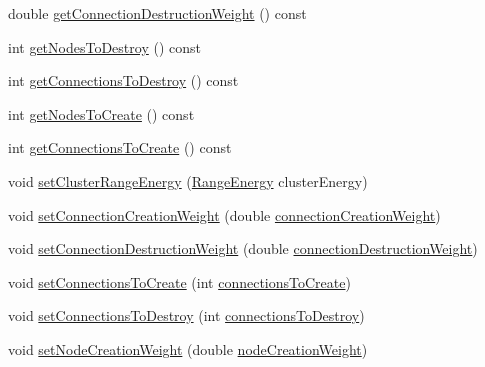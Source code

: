 \begin{DoxyCompactItemize}
\item 
double \hyperlink{classcryomesh_1_1manipulators_1_1ClusterAnalysisData_a37ebc1eeb8acca183b93d379c59f0dc6}{get\-Connection\-Destruction\-Weight} () const 
\item 
int \hyperlink{classcryomesh_1_1manipulators_1_1ClusterAnalysisData_a04bbdb34881e7d5a716e6b45b461a330}{get\-Nodes\-To\-Destroy} () const 
\item 
int \hyperlink{classcryomesh_1_1manipulators_1_1ClusterAnalysisData_aedee2369cd1b2a8c934b3fe75b063eaf}{get\-Connections\-To\-Destroy} () const 
\item 
int \hyperlink{classcryomesh_1_1manipulators_1_1ClusterAnalysisData_a89a5f4d7d395f192c9d7809783584608}{get\-Nodes\-To\-Create} () const 
\item 
int \hyperlink{classcryomesh_1_1manipulators_1_1ClusterAnalysisData_adb384db5722ed36e50218b6a99362524}{get\-Connections\-To\-Create} () const 
\item 
void \hyperlink{classcryomesh_1_1manipulators_1_1ClusterAnalysisData_aa1b5e2b36b91959135ed40a1e0393309}{set\-Cluster\-Range\-Energy} (\hyperlink{structcryomesh_1_1manipulators_1_1ClusterAnalysisData_1_1RangeEnergy}{\-Range\-Energy} cluster\-Energy)
\item 
void \hyperlink{classcryomesh_1_1manipulators_1_1ClusterAnalysisData_a4afa9476dc34d1c4230915c135f0f085}{set\-Connection\-Creation\-Weight} (double \hyperlink{classcryomesh_1_1manipulators_1_1ClusterAnalysisData_a25abb815b2869d410c9d32819471d67b}{connection\-Creation\-Weight})
\item 
void \hyperlink{classcryomesh_1_1manipulators_1_1ClusterAnalysisData_aa8370250c00d64878683d0c34663f23a}{set\-Connection\-Destruction\-Weight} (double \hyperlink{classcryomesh_1_1manipulators_1_1ClusterAnalysisData_ac9f1a2eada7f214b62a257067ee7d336}{connection\-Destruction\-Weight})
\item 
void \hyperlink{classcryomesh_1_1manipulators_1_1ClusterAnalysisData_a390b7af8b7aaad30ae2434d3cc38ce34}{set\-Connections\-To\-Create} (int \hyperlink{classcryomesh_1_1manipulators_1_1ClusterAnalysisData_add3ac0cb45a6782d3d92d9d4ea181609}{connections\-To\-Create})
\item 
void \hyperlink{classcryomesh_1_1manipulators_1_1ClusterAnalysisData_a92092f1fc3184708f2360a1f237330c1}{set\-Connections\-To\-Destroy} (int \hyperlink{classcryomesh_1_1manipulators_1_1ClusterAnalysisData_a303e9f1b0de641d8c3f79ff4ad05a9a5}{connections\-To\-Destroy})
\item 
void \hyperlink{classcryomesh_1_1manipulators_1_1ClusterAnalysisData_a41ad78f8918e9898e7c4d08263e631c2}{set\-Node\-Creation\-Weight} (double \hyperlink{classcryomesh_1_1manipulators_1_1ClusterAnalysisData_a135e912ae399505480429e488a163d75}{node\-Creation\-Weight})

\end{DoxyCompactItemize}
